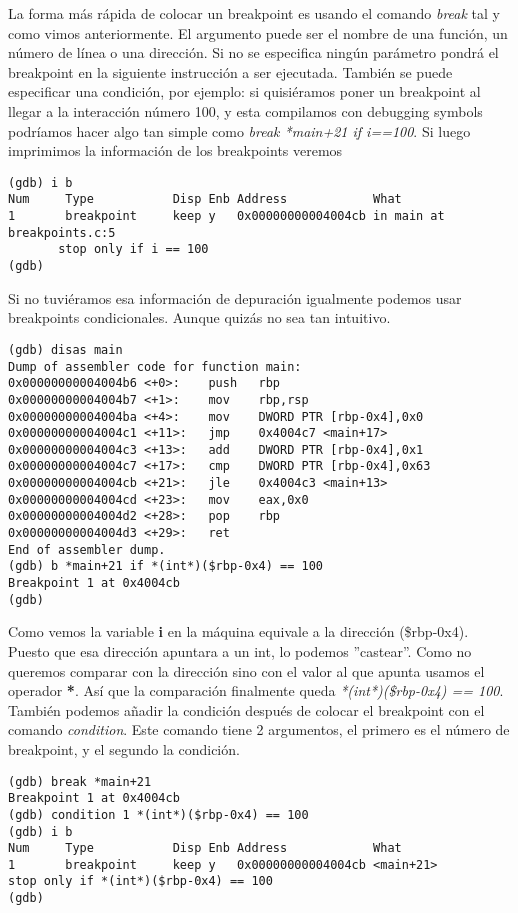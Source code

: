 La forma más rápida de colocar un breakpoint es usando el comando \emph{break} tal y como vimos anteriormente. El argumento puede ser el nombre de una función, un número de línea o una dirección. Si no se especifica ningún parámetro pondrá el breakpoint en la siguiente instrucción a ser ejecutada. También se puede especificar una condición, por ejemplo: si quisiéramos poner un breakpoint al llegar a la interacción número 100, y esta compilamos con debugging symbols podríamos hacer algo tan simple como \emph{break *main+21 if i==100}. Si luego imprimimos la información de los breakpoints veremos 
\begin{verbatim}
(gdb) i b
Num     Type           Disp Enb Address            What
1       breakpoint     keep y   0x00000000004004cb in main at breakpoints.c:5
       stop only if i == 100
(gdb) 
\end{verbatim}
Si no tuviéramos esa información de depuración igualmente podemos usar breakpoints condicionales. Aunque quizás no sea tan intuitivo.
\begin{verbatim}
(gdb) disas main
Dump of assembler code for function main:
0x00000000004004b6 <+0>:	push   rbp
0x00000000004004b7 <+1>:	mov    rbp,rsp
0x00000000004004ba <+4>:	mov    DWORD PTR [rbp-0x4],0x0
0x00000000004004c1 <+11>:	jmp    0x4004c7 <main+17>
0x00000000004004c3 <+13>:	add    DWORD PTR [rbp-0x4],0x1
0x00000000004004c7 <+17>:	cmp    DWORD PTR [rbp-0x4],0x63
0x00000000004004cb <+21>:	jle    0x4004c3 <main+13>
0x00000000004004cd <+23>:	mov    eax,0x0
0x00000000004004d2 <+28>:	pop    rbp
0x00000000004004d3 <+29>:	ret    
End of assembler dump.
(gdb) b *main+21 if *(int*)($rbp-0x4) == 100
Breakpoint 1 at 0x4004cb
(gdb) 
\end{verbatim}
Como vemos la variable \textbf{i} en la máquina equivale a la dirección (\$rbp-0x4). Puesto que esa dirección apuntara a un int, lo podemos ''castear''. Como no queremos comparar con la dirección sino con el valor al que apunta usamos el operador \textbf{*}. Así que la comparación finalmente queda \emph{*(int*)(\$rbp-0x4) == 100}.\\
También podemos añadir la condición después de colocar el breakpoint con el comando \emph{condition}. Este comando tiene 2 argumentos, el primero es el número de breakpoint, y el segundo la condición. 
\begin{verbatim}
(gdb) break *main+21
Breakpoint 1 at 0x4004cb
(gdb) condition 1 *(int*)($rbp-0x4) == 100
(gdb) i b
Num     Type           Disp Enb Address            What
1       breakpoint     keep y   0x00000000004004cb <main+21>
stop only if *(int*)($rbp-0x4) == 100
(gdb)
\end{verbatim}

